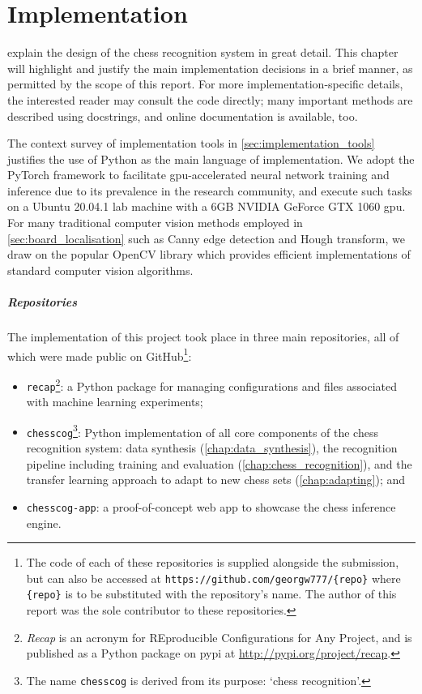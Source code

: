 \documentclass[../main.tex]{subfiles}
\begin{document}
\chapter{Implementation}
\label{chap:implementation}
 explain the design of the chess recognition system in great detail.
This chapter will highlight and justify the main implementation decisions in a brief manner, as permitted by the scope of this report.
For more implementation-specific details, the interested reader may consult the code directly; many important methods are described using docstrings, and online documentation is available, too.

The context survey of implementation tools in \cref{sec:implementation_tools} justifies the use of Python as the main language of implementation.
We adopt the PyTorch framework \cite{pytorch2019} to facilitate \acs{gpu}-accelerated neural network training and inference due to its prevalence in the research community, and execute such tasks on a Ubuntu 20.04.1 lab machine with a 6GB NVIDIA GeForce GTX 1060 \gls{gpu}.
For many traditional computer vision methods employed in \cref{sec:board_localisation} such as Canny edge detection and Hough transform, we draw on the popular OpenCV library \cite{opencv2000} which provides efficient implementations of standard computer vision algorithms.

\paragraph{Repositories}
The implementation of this project took place in three main repositories, all of which were made public on GitHub\footnote{The code of each of these repositories is supplied alongside the submission, but can also be accessed at \texttt{https://github.com/georgw777/\{repo\}} where \texttt{\{repo\}} is to be substituted with the repository's name. The author of this report was the sole contributor to these repositories.}:
\begin{itemize}
    \item \texttt{recap}\footnote{\emph{Recap} is an acronym for REproducible Configurations for Any Project, and is published as a Python package on \acs{pypi} at \url{http://pypi.org/project/recap}.}: a Python package for managing configurations and files associated with machine learning experiments;
    \item \texttt{chesscog}\footnote{The name \texttt{chesscog} is derived from its purpose: `chess recognition'.}: Python implementation of all core components of the chess recognition system: data synthesis (\cref{chap:data_synthesis}), the recognition pipeline including training and evaluation (\cref{chap:chess_recognition}), and the transfer learning approach to adapt to new chess sets (\cref{chap:adapting}); and
    \item \texttt{chesscog-app}: a proof-of-concept web app to showcase the chess inference engine.
\end{itemize}
\end{document}

